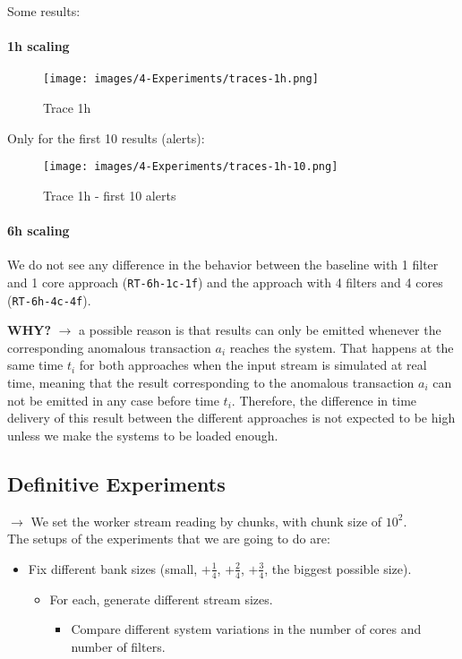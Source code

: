 Some results:

\paragraph{1h scaling\\}



\begin{figure}[H]
  \centering
  \texttt{[image: images/4-Experiments/traces-1h.png]}
  \caption{Trace 1h}
\end{figure}

Only for the first 10 results (alerts):
\begin{figure}[H]
  \centering
  \texttt{[image: images/4-Experiments/traces-1h-10.png]}
  \caption{Trace 1h - first 10 alerts}
\end{figure}

\paragraph{6h scaling\\}

We do not see any difference in the behavior between the baseline with 1 filter and 1 core approach (\texttt{RT-6h-1c-1f}) and the approach with 4 filters and 4 cores (\texttt{RT-6h-4c-4f}). 

\textbf{WHY?} $\rightarrow$ a possible reason is that results can only be emitted whenever the corresponding anomalous transaction $a_i$ reaches the system. That happens at the same time $t_i$ for both approaches when the input stream is simulated at real time, meaning that the result corresponding to the anomalous transaction $a_i$ can not be emitted in any case before time $t_i$. Therefore, the difference in time delivery of this result between the different approaches is not expected to be high unless we make the systems to be loaded enough.

\subsection{Definitive Experiments}

$\rightarrow$ We set the worker stream reading by chunks, with chunk size of $10^2$.\\

The setups of the experiments that we are going to do are:
\begin{itemize}
  \item Fix different bank sizes (small, $+\frac{1}{4}$, $+\frac{2}{4}$, $+\frac{3}{4}$, the biggest possible size).
  \begin{itemize}
    \item For each, generate different stream sizes.
    \begin{itemize}
      \item Compare different system variations in the number of cores and number of filters.
    \end{itemize}
  \end{itemize}
\end{itemize}

